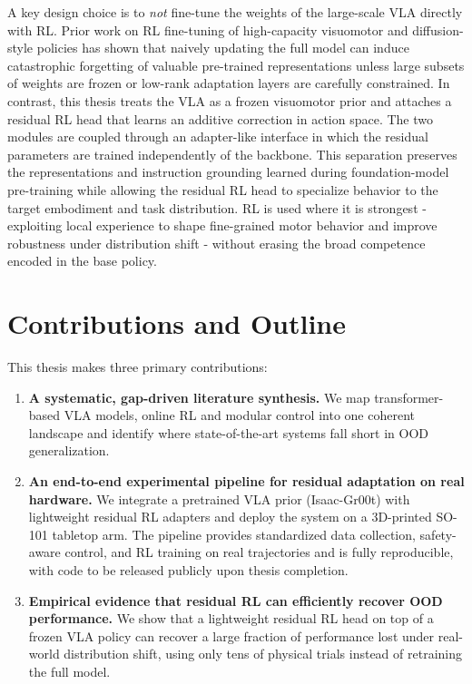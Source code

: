 A key design choice is to \emph{not} fine-tune the weights of the large-scale \ac{VLA} directly with \ac{RL}. Prior work on \ac{RL} fine-tuning of high-capacity visuomotor and diffusion-style policies has shown that naively updating the full model can induce catastrophic forgetting of valuable pre-trained representations unless large subsets of weights are frozen or low-rank adaptation layers are carefully constrained. In contrast, this thesis treats the \ac{VLA} as a frozen visuomotor prior and attaches a residual \ac{RL} head that learns an additive correction in action space. The two modules are coupled through an adapter-like interface in which the residual parameters are trained independently of the backbone. This separation preserves the representations and instruction grounding learned during foundation-model pre-training while allowing the residual \ac{RL} head to specialize behavior to the target embodiment and task distribution. \ac{RL} is used where it is strongest - exploiting local experience to shape fine-grained motor behavior and improve robustness under distribution shift - without erasing the broad competence encoded in the base policy.

\section{Contributions and Outline}

This thesis makes three primary contributions:

\begin{enumerate}
    \item \textbf{A systematic, gap-driven literature synthesis.}  
    We map transformer-based \ac{VLA} models, online \ac{RL} and modular control into one coherent landscape and identify where state-of-the-art systems fall short in \ac{OOD} generalization.

    \item \textbf{An end-to-end experimental pipeline for residual adaptation on real hardware.}  
    We integrate a pretrained \ac{VLA} prior (Isaac-Gr00t) with lightweight residual \ac{RL} adapters and deploy the system on a 3D-printed SO-101 tabletop arm. The pipeline provides standardized data collection, safety-aware control, and \ac{RL} training on real trajectories and is fully reproducible, with code to be released publicly upon thesis completion.

    \item \textbf{Empirical evidence that residual \ac{RL} can efficiently recover \ac{OOD} performance.}  
    We show that a lightweight residual \ac{RL} head on top of a frozen \ac{VLA} policy can recover a large fraction of performance lost under real-world distribution shift, using only tens of physical trials instead of retraining the full model.
\end{enumerate}


